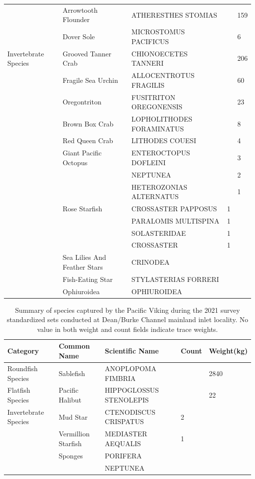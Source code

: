 \documentclass[12pt]{article}\usepackage[]{graphicx}\usepackage[]{color}
\begin{document}
\begin{table}[!h]
\begin{tabular}[t]{lllll}
 & Arrowtooth Flounder & ATHERESTHES STOMIAS &  & 159\\
 & Dover Sole & MICROSTOMUS PACIFICUS &  & 6\\
\midrule
Invertebrate Species & Grooved Tanner Crab & CHIONOECETES TANNERI &  & 206\\
 & Fragile Sea Urchin & ALLOCENTROTUS FRAGILIS &  & 60\\
 & Oregontriton & FUSITRITON OREGONENSIS &  & 23\\
 & Brown Box Crab & LOPHOLITHODES FORAMINATUS &  & 8\\
 & Red Queen Crab & LITHODES COUESI &  & 4\\
 & Giant Pacific Octopus & ENTEROCTOPUS DOFLEINI &  & 3\\
 &  & NEPTUNEA &  & 2\\
 &  & HETEROZONIAS ALTERNATUS &  & 1\\
 & Rose Starfish & CROSSASTER PAPPOSUS & 1 & \\
 &  & PARALOMIS MULTISPINA & 1 & \\
 &  & SOLASTERIDAE & 1 & \\
 &  & CROSSASTER & 1 & \\
 & Sea Lilies And Feather Stars & CRINODEA &  & \\
 & Fish-Eating Star & STYLASTERIAS FORRERI &  & \\
 & Ophiuroidea & OPHIUROIDEA &  & \\
\bottomrule
\end{tabular}
\end{table}
\clearpage


\begin{table}[!h]

\caption{\label{tab:table5}Summary of species captured by the Pacific Viking during the 2021 survey standardized sets conducted at Dean/Burke Channel mainland inlet locality. No value in both weight and count fields indicate trace weights.}
\fontsize{8}{10}\selectfont
\begin{tabular}[t]{lllll}
\toprule
\textbf{Category} & \textbf{Common Name} & \textbf{Scientific Name} & \textbf{Count} & \textbf{Weight(kg)}\\
\midrule
Roundfish Species & Sablefish & ANOPLOPOMA FIMBRIA &  & 2840\\
\midrule
Flatfish Species & Pacific Halibut & HIPPOGLOSSUS STENOLEPIS &  & 22\\
\midrule
Invertebrate Species & Mud Star & CTENODISCUS CRISPATUS & 2 & \\
 & Vermillion Starfish & MEDIASTER AEQUALIS & 1 & \\
 & Sponges & PORIFERA &  & \\
 &  & NEPTUNEA &  & \\
\bottomrule
\end{tabular}
\end{table}
\end{document}
